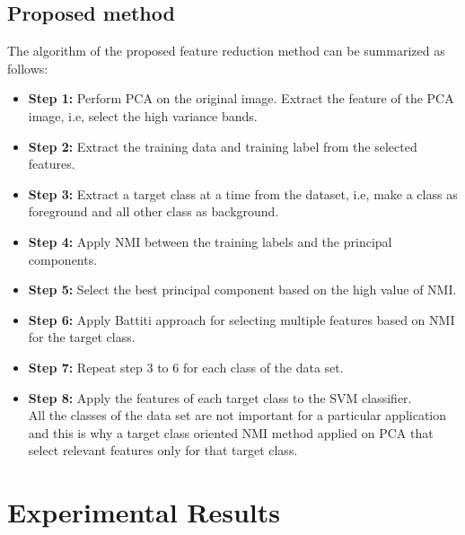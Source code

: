 \documentclass[document.tex]{subfiles}
\begin{document}
\subsection{Proposed method}
The algorithm of the proposed feature reduction method can be
summarized as follows:
\begin{itemize}
	\item \textbf{Step 1:} Perform PCA on the original image. Extract the feature of the PCA image, i.e, select the high variance bands.
	\item \textbf{Step 2:} Extract the training data and training label from the
	selected features.
	\item \textbf{Step 3:} Extract a target class at a time from the dataset, i.e, make a class as foreground and all other class as background. 
	\item \textbf{Step 4:} Apply NMI between the training labels and the principal components.
	\item \textbf{Step 5:} Select the best principal component based on the high value of NMI.
	\item \textbf{Step 6:} Apply Battiti\cite{23} approach for selecting multiple features based on NMI for the target class.
	\item \textbf{Step 7:} Repeat step 3 to 6 for each class of the data set.
	\item \textbf{Step 8:} Apply the features of each target class to the SVM classifier.\\
	All the classes of the data set are not important for a particular application and this is why a target class oriented NMI method applied on PCA that select relevant features only for that target class. 
\end{itemize}

\section{Experimental Results}
\end{document}
